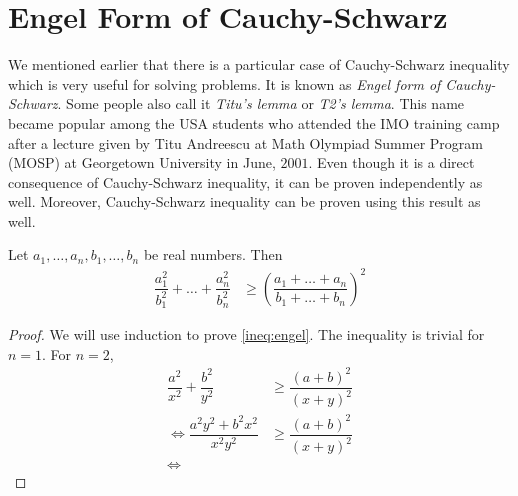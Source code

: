 \documentclass{subfile}
\begin{document}
	\chapter{Engel Form of Cauchy-Schwarz}\label{ch:engel}
	We mentioned earlier that there is a particular case of Cauchy-Schwarz inequality which is very useful for solving problems. It is known as \textit{Engel form of Cauchy-Schwarz}. Some people also call it \textit{Titu's lemma} or \textit{T2's lemma}. This name became popular among the USA students who attended the IMO training camp after a lecture given by Titu Andreescu at Math Olympiad Summer Program (MOSP) at Georgetown University in June, $2001$. Even though it is a direct consequence of Cauchy-Schwarz inequality, it can be proven independently as well. Moreover, Cauchy-Schwarz inequality can be proven using this result as well.
		\begin{theorem}
			Let $a_1,\ldots,a_n,b_1,\ldots,b_n$ be real numbers. Then
				\begin{align}
					\dfrac{a_1^2}{b_1^2}+\ldots+\dfrac{a_n^2}{b_n^2}
						& \geq\left(\dfrac{a_1+\ldots+a_n}{b_1+\ldots+b_n}\right)^2\label{ineq:engel}
				\end{align}
		\end{theorem}
	
		\begin{proof}
			We will use induction to prove \ref{ineq:engel}. The inequality is trivial for $n=1$. For $n=2$,
				\begin{align*}
					\dfrac{a^2}{x^2}+\dfrac{b^2}{y^2}
						& \geq\dfrac{(a+b)^2}{(x+y)^2}\\
					\iff\dfrac{a^2y^2+b^2x^2}{x^2y^2}
						& \geq\dfrac{(a+b)^2}{(x+y)^2}\\
					\iff
				\end{align*}
		\end{proof}
\end{document}
